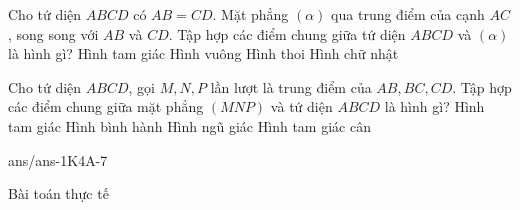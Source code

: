 \begin{ex}%
	Cho tứ diện $ABCD$ có $AB=CD$. Mặt phẳng $( \alpha )$ qua trung điểm của cạnh $AC$, song song với $AB$ và $CD$. Tập hợp các điểm chung giữa tứ diện $ABCD$ và $(\alpha)$ là hình gì?
	\choice
	{ Hình tam giác}
	{ Hình vuông}
	{\True Hình thoi}
	{ Hình chữ nhật}
\end{ex}
\begin{ex}%
	Cho tứ diện $ABCD$, gọi $M,N,P$ lần lượt là trung điểm của $AB,BC,CD$. Tập hợp các điểm chung giữa mặt phẳng $(MNP)$ và tứ diện $ ABCD $ là hình gì?
	\choice
	{ Hình tam giác}
	{\True Hình bình hành}
	{ Hình ngũ giác}
	{ Hình tam giác cân}
\end{ex}

\begin{indapan}{10}
	{ans/ans-1K4A-7}
\end{indapan}

\begin{dang}{Bài toán thực tế}
	
\end{dang}

